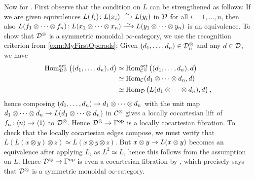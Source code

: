 \begin{proof*}
	Now for . First observe that the condition on $L$ can be strengthened as follows: If we are given equivalences $L(f_i)\colon L(x_i)\isomorphism L(y_i)$ in $\mathcal{D}$ for all $i=1,\dotsc,n$, then also $L(f_1\otimes\dotsb\otimes f_n)\colon L(x_1\otimes\dotsb\otimes x_n)\isomorphism L(y_1\otimes\dotsb\otimes y_n)$ is an equivalence. To show that $\mathcal{D}^\otimes$ is a symmetric monoidal $\infty$-category, we use the recognition criterion from \cref{exm:MyFirstOperads}: Given $(d_1,\dotsc,d_n)\in\mathcal{D}_n^\otimes$ and any $d\in \mathcal{D}$, we have
	\begin{align*}
		\operatorname{Hom}_{\mathcal{D}^\otimes}^\mathrm{act}\big((d_1,\dotsc,d_n),d\big)&\simeq \operatorname{Hom}_{\mathcal{C}^\otimes}^\mathrm{act}\big((d_1,\dotsc,d_n),d\big)\\
		&\simeq \operatorname{Hom}_{\mathcal{C}}(d_1\otimes\dotsb\otimes d_n,d)\\
		&\simeq \operatorname{Hom}_{\mathcal{D}}\big(L(d_1\otimes\dotsb\otimes d_n),d\big)\,,
	\end{align*}
	hence composing $(d_1,\dotsc,d_n)\morphism d_1\otimes\dotsb\otimes d_n$ with the unit map $ d_1\otimes\dotsb\otimes d_n\morphism L(d_1\otimes\dotsb\otimes d_n)$ in $\mathcal{C}^\otimes$ gives a locally cocartesian lift of $f_n\colon \langle n\rangle \morphism\langle 1\rangle$ to $\mathcal{D}^\otimes$. Hence $\Dd^\otimes\morphism\IGamma^\op$ is a locally cocartesian fibration. To check that the locally cocartesian edges compose, we must verify that $L(L(x\otimes y)\otimes z)\simeq L(x\otimes y\otimes z)$. But $x\otimes y\morphism L(x\otimes y)$ becomes an equivalence after applying $L$, as $L^2\simeq L$, hence this follows from the assumption on $L$. Hence $\Dd^\otimes\morphism\IGamma^\op$ is even a cocartesian fibration by \cite[Proposition~IX.13]{HigherCatsII}, which precisely says that $\mathcal{D}^\otimes$ is a symmetric monoidal $\infty$-category.
	

\end{proof*}
